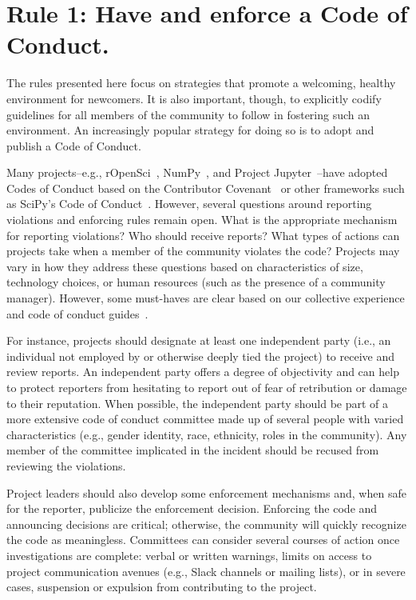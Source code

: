 \documentclass[10pt,letterpaper]{article}
\newcommand{\rulemajor}[1]{\section*{#1}}
\begin{document}
\rulemajor{Rule 1: Have and enforce a Code of Conduct.}

The rules presented here focus on strategies that promote a welcoming, healthy environment for newcomers.
It is also important, though, to explicitly codify guidelines for all members of the community to follow
in fostering such an environment.
An increasingly popular strategy for doing so is to adopt and publish a Code of Conduct.

Many projects--e.g., rOpenSci~\cite{ropensci-coc}, NumPy~\cite{numpy-coc}, and Project Jupyter~\cite{jupyter-coc}--have adopted Codes of Conduct
based on the Contributor Covenant~\cite{covenant}
or other frameworks such as SciPy's Code of Conduct~\cite{scipy-coc}.
However, several questions around reporting violations and enforcing rules remain open.
What is the appropriate mechanism for reporting violations?
Who should receive reports?
What types of actions can projects take when a member of the community violates the code?
Projects may vary in how they address these questions based on characteristics of size, technology choices, or human resources
(such as the presence of a community manager).
However, some must-haves are clear based on our collective experience and code of conduct guides~\cite{aurora2019}.

For instance,
projects should designate at least one independent party
(i.e., an individual not employed by or otherwise deeply tied the project)
to receive and review reports.
An independent party offers a degree of objectivity
and can help to protect reporters from hesitating to report out of fear of retribution or damage to their reputation.
When possible,
the independent party should be part of a more extensive code of conduct committee made up of several people with varied characteristics
(e.g., gender identity, race, ethnicity, roles in the community).
Any member of the committee implicated in the incident should be recused from reviewing the violations.

Project leaders should also develop some enforcement mechanisms and,
when safe for the reporter,
publicize the enforcement decision.
Enforcing the code and announcing decisions are critical;
otherwise,
the community will quickly recognize the code as meaningless.
Committees can consider several courses of action once investigations are complete:
verbal or written warnings,
limits on access to project communication avenues (e.g., Slack channels or mailing lists),
or in severe cases,
suspension or expulsion from contributing to the project.
\end{document}
